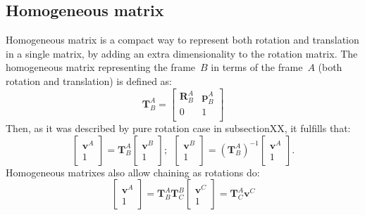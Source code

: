 \subsection{Homogeneous matrix}
\label{subsec:homogeneous_matrix}
Homogeneous matrix is a compact way to represent both rotation and translation in a single matrix, by adding an extra dimensionality to the rotation matrix.  
The homogeneous matrix representing the frame~$B$ in terms of the frame~$A$ (both rotation and translation) is defined as:
\begin{equation}
 \mathbf{T}^A_B = 
 \left[
 \begin{array}{cc}
  \mathbf{R}^A_B & \mathbf{p}^A_B \\
  0	& 	1 \\
 \end{array}
\right]
\end{equation}
Then, as it was described by pure rotation case in subsectionXX, it fulfills that:
\begin{equation}
\left[
 \begin{array}{c}
  \mathbf{v}^A \\
  1
 \end{array}
 \right]
 = \mathbf{T}^A_B 
 \left[
 \begin{array}{c}
  \mathbf{v}^B \\
  1
 \end{array}
 \right]; \ \
 \left[
 \begin{array}{c}
  \mathbf{v}^B \\
  1
 \end{array}
 \right]
  = (\mathbf{T}^A_B)^{-1} 
 \left[
 \begin{array}{c}
  \mathbf{v}^A \\
  1
 \end{array}
 \right].
\end{equation}
Homogeneous matrixes also allow chaining as rotations do:
\begin{equation}
 \left[
 \begin{array}{c}
  \mathbf{v}^A \\
  1
 \end{array}
 \right]
 = \mathbf{T}^A_B \mathbf{T}^B_C 
  \left[
 \begin{array}{c}
  \mathbf{v}^C \\
  1
 \end{array}
 \right]
 = \mathbf{T}^A_C \mathbf{v}^C
\end{equation}

